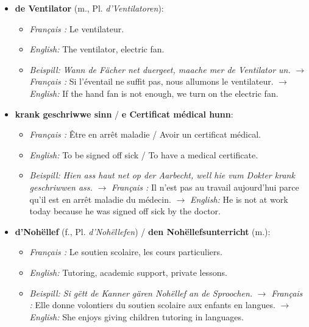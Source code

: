 \begin{itemize}
    \vspace{0.6em}

    \item \textbf{de Ventilator} (m., Pl. \textit{d'Ventilatoren}):
    \begin{itemize}
        \item \textit{Français :} Le ventilateur.
        \item \textit{English:} The ventilator, electric fan.
        \item \textit{Beispill:} \textit{Wann de Fächer net duergeet, maache mer de Ventilator un.}
        $\rightarrow$ \textit{Français :} Si l'éventail ne suffit pas, nous allumons le ventilateur.
        $\rightarrow$ \textit{English:} If the hand fan is not enough, we turn on the electric fan.
    \end{itemize}

    \vspace{0.6em}

    \item \textbf{krank geschriwwe sinn} / \textbf{e Certificat médical hunn}:
    \begin{itemize}
        \item \textit{Français :} Être en arrêt maladie / Avoir un certificat médical.
        \item \textit{English:} To be signed off sick / To have a medical certificate.
        \item \textit{Beispill:} \textit{Hien ass haut net op der Aarbecht, well hie vum Dokter krank geschriwwen ass.}
        $\rightarrow$ \textit{Français :} Il n'est pas au travail aujourd'hui parce qu'il est en arrêt maladie du médecin.
        $\rightarrow$ \textit{English:} He is not at work today because he was signed off sick by the doctor.
    \end{itemize}

    \vspace{0.6em}

    \item \textbf{d'Nohëllef} (f., Pl. \textit{d'Nohëllefen}) / \textbf{den Nohëllefsunterricht} (m.):
    \begin{itemize}
        \item \textit{Français :} Le soutien scolaire, les cours particuliers.
        \item \textit{English:} Tutoring, academic support, private lessons.
        \item \textit{Beispill:} \textit{Si gëtt de Kanner gären Nohëllef an de Sproochen.}
        $\rightarrow$ \textit{Français :} Elle donne volontiers du soutien scolaire aux enfants en langues.
        $\rightarrow$ \textit{English:} She enjoys giving children tutoring in languages.
    \end{itemize}
\end{itemize}

